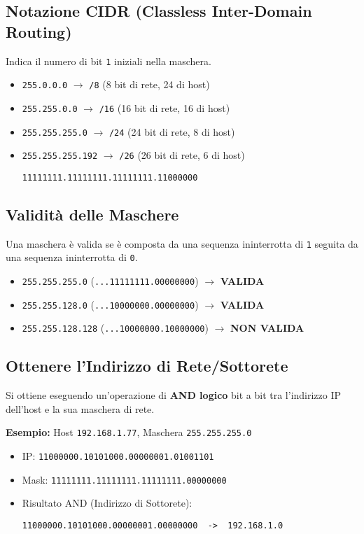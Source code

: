 \documentclass{article}
\begin{document}
\subsection{Notazione CIDR (Classless Inter-Domain Routing)}
Indica il numero di bit \texttt{1} iniziali nella maschera.
\begin{itemize}
    \item \texttt{255.0.0.0} $\rightarrow$ \texttt{/8} (8 bit di rete, 24 di host)
    \item \texttt{255.255.0.0} $\rightarrow$ \texttt{/16} (16 bit di rete, 16 di host)
    \item \texttt{255.255.255.0} $\rightarrow$ \texttt{/24} (24 bit di rete, 8 di host)
    \item \texttt{255.255.255.192} $\rightarrow$ \texttt{/26} (26 bit di rete, 6 di host)
    \begin{verbatim}
11111111.11111111.11111111.11000000
    \end{verbatim}
\end{itemize}

\subsection{Validità delle Maschere}
Una maschera è valida se è composta da una sequenza ininterrotta di \texttt{1} seguita da una sequenza ininterrotta di \texttt{0}.
\begin{itemize}
    \item \texttt{255.255.255.0} (\texttt{...11111111.00000000}) $\rightarrow$ \textbf{VALIDA}
    \item \texttt{255.255.128.0} (\texttt{...10000000.00000000}) $\rightarrow$ \textbf{VALIDA}
    \item \texttt{255.255.128.128} (\texttt{...10000000.10000000}) $\rightarrow$ \textbf{NON VALIDA}
\end{itemize}

\subsection{Ottenere l'Indirizzo di Rete/Sottorete}
Si ottiene eseguendo un'operazione di \textbf{AND logico} bit a bit tra l'indirizzo IP dell'host e la sua maschera di rete.

\textbf{Esempio:} Host \texttt{192.168.1.77}, Maschera \texttt{255.255.255.0}
\begin{itemize}
    \item IP: \texttt{11000000.10101000.00000001.01001101}
    \item Mask: \texttt{11111111.11111111.11111111.00000000}
    \item Risultato AND (Indirizzo di Sottorete):
    \begin{verbatim}
11000000.10101000.00000001.00000000  ->  192.168.1.0
    \end{verbatim}
\end{itemize}
\end{document}
